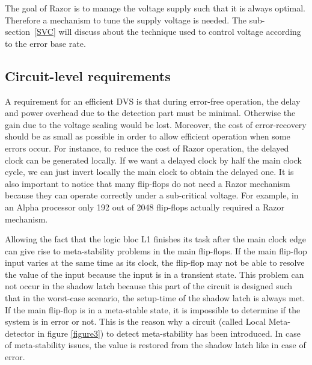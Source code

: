 \documentclass[fleqn,envcountsame,runningheads,10pt,a4paper]{llncs}
\begin{document}
The goal of Razor is to manage the voltage supply such that it is always optimal. Therefore a mechanism to tune the supply voltage is needed. The sub-section~\ref{SVC} will discuss about the technique used to control voltage according to the error base rate.

\subsection{Circuit-level requirements}
\label{CLR}
A requirement for an efficient DVS is that during error-free operation,
the delay and power overhead due to the detection part must be minimal.
Otherwise the gain due to the voltage scaling would be lost. Moreover,
the cost of error-recovery should be as small as possible in order to
allow efficient operation when some errors occur. For instance, to
reduce the cost of Razor operation, the delayed clock can be generated
locally. If we want a delayed clock by half the main clock cycle, we can
just invert locally the main clock to obtain the delayed one. It is also
important to notice that many flip-flops do not need a Razor mechanism
because they can operate correctly under a sub-critical voltage. For
example, in an Alpha processor only 192 out of 2048 flip-flops actually
required a Razor mechanism. %

Allowing the fact that the logic bloc L1 finishes its task after the main clock edge can give rise to meta-stability problems in the main flip-flops. If the main flip-flop input varies at the same time as its clock, the flip-flop may not be able to resolve the value of the input because the input is in a transient state. This problem can not occur in the shadow latch because this part of the circuit is designed such that in the worst-case scenario, the setup-time of the shadow latch is always met. If the main flip-flop is in a meta-stable state, it is impossible to determine if the system is in error or not. This is the reason why a circuit (called Local Meta-detector in figure \ref{figure3}) to detect meta-stability has been introduced. In case of meta-stability issues, the value is restored from the shadow latch like in case of error.
\end{document}
